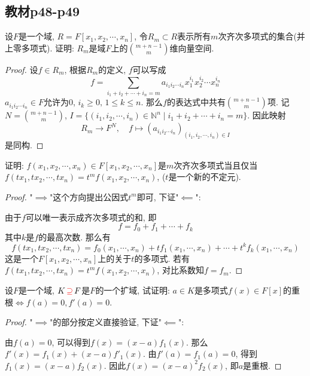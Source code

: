 \subsection{教材p48-p49}

\begin{problem}
    设$F$是一个域, $R = F[x_1, x_2, \cdots, x_n]$, 令$R_m \subset R$表示所有$m$次齐次多项式的集合(并上零多项式). 证明: $R_m$是域$F$上的$\binom{m + n - 1}{m}$维向量空间.
\end{problem}

\begin{proof}
    设$f \in R_m$, 根据$R_m$的定义, $f$可以写成
    \[
        f = \sum_{i_1 + i_2 + \cdots + i_n = m} a_{i_1i_2 \cdots i_n}x_1^{i_1}x_2^{i_2} \cdots x_n^{i_n}
    \]
    $a_{i_1i_2 \cdots i_n} \in F$允许为$0$, $i_k \geqslant 0,\, 1 \leqslant k \leqslant n$. 那么$f$的表达式中共有$\binom{m + n - 1}{m}$项. 记$N = \binom{m + n - 1}{m}$, $I = \{(i_1, i_2, \cdots, i_n) \in \mathbb{N}^n \mid i_1 + i_2 + \cdots + i_n = m\}$. 因此映射
    \[
        R_m \to F^{N},\quad f \mapsto (a_{i_1i_2 \cdots i_n})_{(i_1, i_2, \cdots, i_n) \in I}
    \]
    是同构.
\end{proof}

\begin{problem}
    证明: $f(x_1, x_2, \cdots, x_n) \in F[x_1, x_2, \cdots, x_n]$是$m$次齐次多项式当且仅当$f(tx_1, tx_2, \cdots, tx_n) = t^mf(x_1, x_2, \cdots, x_n)$, ($t$是一个新的不定元).
\end{problem}

\begin{proof}
    "$\implies$"这个方向提出公因式$t^m$即可, 下证"$\impliedby$":

    由于$f$可以唯一表示成齐次多项式的和, 即
    \[
        f = f_0 + f_1 + \cdots + f_k
    \]
    其中$k$是$f$的最高次数. 那么有
    \[
        f(tx_1, tx_2, \cdots, tx_n) = f_0(x_1, \cdots, x_n) + tf_1(x_1, \cdots, x_n) + \cdots + t^kf_k(x_1, \cdots, x_n)
    \]
    这是一个$F[x_1, x_2, \cdots, x_n]$上的关于$t$的多项式. 若有$f(tx_1, tx_2, \cdots, tx_n) = t^mf(x_1, x_2, \cdots, x_n)$, 对比系数知$f = f_m$.
\end{proof}

\begin{problem}
    设$F$是一个域, $K \,\textcolor{red}{\supseteq}\, F$是$F$的一个扩域, 试证明: $a \in K$是多项式$f(x) \in F[x]$的重根$\Leftrightarrow f(a) = 0, f'(a) = 0$.
\end{problem}

\begin{proof}
    "$\implies$"的部分按定义直接验证, 下证"$\impliedby$":

    由$f(a) = 0$, 可以得到$f(x) = (x - a)f_1(x)$. 那么$f'(x) = f_1(x) + (x - a)f'_1(x)$. 由$f'(a) = f_1(a) = 0$, 得到$f_1(x) = (x - a)f_2(x)$. 因此$f(x) = (x - a)^2f_2(x)$, 即$a$是重根.
\end{proof}

